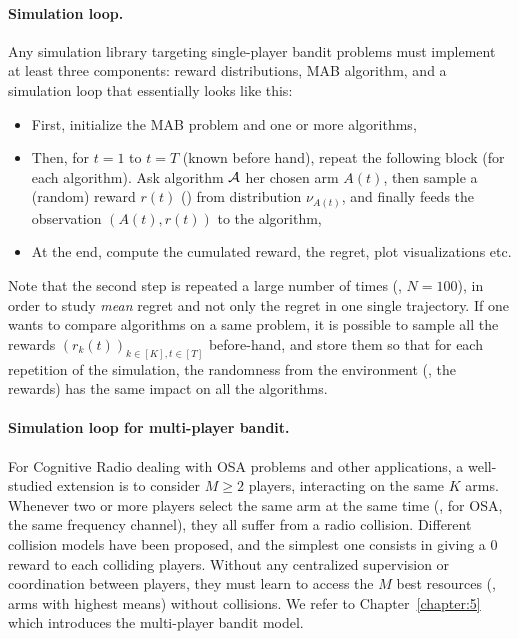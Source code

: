 \paragraph{Simulation loop.}
%
Any simulation library targeting single-player bandit problems must implement at least three components:
reward distributions, MAB algorithm, and a simulation loop that essentially looks like this:
\begin{itemize}
    \item First, initialize the MAB problem and one or more algorithms,
    \item Then, for $t=1$ to $t=T$ (known before hand), repeat the following block (for each algorithm). Ask algorithm $\mathcal{A}$ her chosen arm $A(t)$, then sample a (random) reward $r(t)$ (\iid) from distribution $\nu_{A(t)}$, and finally feeds the observation $(A(t), r(t))$ to the algorithm,
    \item At the end, compute the cumulated reward, the regret, plot visualizations etc.
\end{itemize}
%
Note that the second step is repeated a large number of times (\eg, $N=100$), in order to study \emph{mean} regret and not only the regret in one single trajectory.
If one wants to compare algorithms on a same problem, it is possible to sample all the rewards $(r_k(t))_{k\in[K], t\in[T]}$ before-hand, and store them so that for each repetition of the simulation, the randomness from the environment (\ie, the rewards) has the same impact on all the algorithms.


\paragraph{Simulation loop for multi-player bandit.}

For Cognitive Radio dealing with OSA problems and other applications, a well-studied extension is to consider $M\geq2$ players, interacting on the same $K$ arms.
Whenever two or more players select the same arm at the same time (\eg, for OSA, the same frequency channel), they all suffer from a radio collision.
%
Different collision models have been proposed, and the simplest one consists in giving a $0$ reward to each colliding players.
Without any centralized supervision or coordination between players, they must learn to access the $M$ best resources (\ie, arms with highest means) without collisions.
We refer to Chapter~\ref{chapter:5} which introduces the multi-player bandit model.

